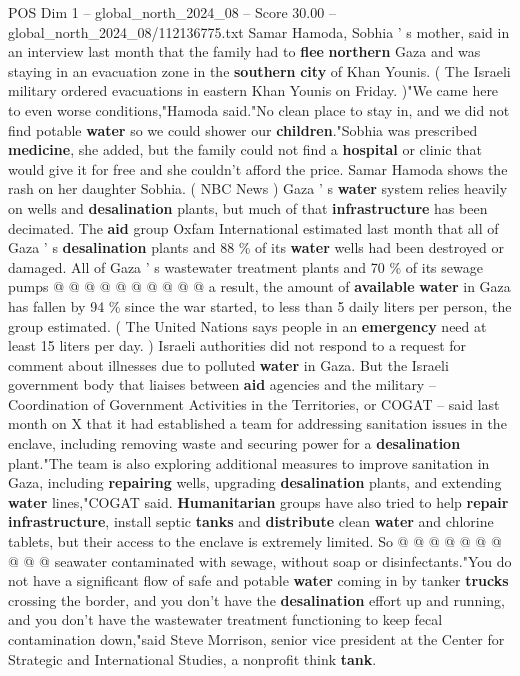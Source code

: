 \begin{textsample}{POS Dim 1 – global\_north\_2024\_08 – Score 30.00 – global\_north\_2024\_08/112136775.txt}  \label{ex:f1_pos_405}
Samar Hamoda, Sobhia ' s mother, said in an interview last month that the family had to \textbf{flee} \textbf{northern} Gaza and was staying in an evacuation zone in the \textbf{southern} \textbf{city} of Khan Younis. ( The Israeli military ordered evacuations in eastern Khan Younis on Friday. )"We came here to even worse conditions,"Hamoda said."No clean place to stay in, and we did not find potable \textbf{water} so we could shower our \textbf{children}."Sobhia was prescribed \textbf{medicine}, she added, but the family could not find a \textbf{hospital} or clinic that would give it for free and she couldn't afford the price.
Samar Hamoda shows the rash on her daughter Sobhia. ( NBC News ) Gaza ' s \textbf{water} system relies heavily on wells and \textbf{desalination} plants, but much of that \textbf{infrastructure} has been decimated.
The \textbf{aid} group Oxfam International estimated last month that all of Gaza ' s \textbf{desalination} plants and 88 \% of its \textbf{water} wells had been destroyed or damaged.
All of Gaza ' s wastewater treatment plants and 70 \% of its sewage pumps @ @ @ @ @ @ @ @ @ @ a result, the amount of \textbf{available} \textbf{water} in Gaza has fallen by 94 \% since the war started, to less than 5 daily liters per person, the group estimated. ( The United Nations says people in an \textbf{emergency} need at least 15 liters per day. ) Israeli authorities did not respond to a request for comment about illnesses due to polluted \textbf{water} in Gaza.
But the Israeli government body that liaises between \textbf{aid} agencies and the military -- Coordination of Government Activities in the Territories, or COGAT -- said last month on X that it had established a team for addressing sanitation issues in the enclave, including removing waste and securing power for a \textbf{desalination} plant."The team is also exploring additional measures to improve sanitation in Gaza, including \textbf{repairing} wells, upgrading \textbf{desalination} plants, and extending \textbf{water} lines,"COGAT said. \textbf{Humanitarian} groups have also tried to help \textbf{repair} \textbf{infrastructure}, install septic \textbf{tanks} and \textbf{distribute} clean \textbf{water} and chlorine tablets, but their access to the enclave is extremely limited.
So @ @ @ @ @ @ @ @ @ @ seawater contaminated with sewage, without soap or disinfectants."You do not have a significant flow of safe and potable \textbf{water} coming in by tanker \textbf{trucks} crossing the border, and you don't have the \textbf{desalination} effort up and running, and you don't have the wastewater treatment functioning to keep fecal contamination down,"said Steve Morrison, senior vice president at the Center for Strategic and International Studies, a nonprofit think \textbf{tank}.

\end{textsample}
